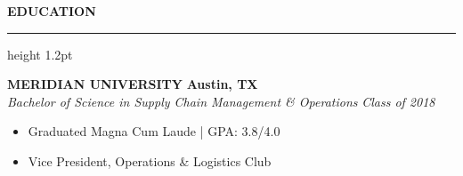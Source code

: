 \documentclass{article}
\newcommand{\resumesection}[1]{%
  \vspace{8pt}%
  {\color{primary}\large\bfseries\MakeUppercase{#1}}\\%
  \vspace{-6pt}%
  {\color{primary}\hrule height 1.2pt}%
  \vspace{6pt}%
}
\begin{document}
\resumesection{Education}
\textbf{MERIDIAN UNIVERSITY} \hfill \textbf{Austin, TX}\\
\textit{Bachelor of Science in Supply Chain Management \& Operations} \hfill \textit{Class of 2018}
\begin{itemize}
  \item Graduated Magna Cum Laude | GPA: 3.8/4.0
  \item Vice President, Operations \& Logistics Club
\end{itemize}
\end{document}
